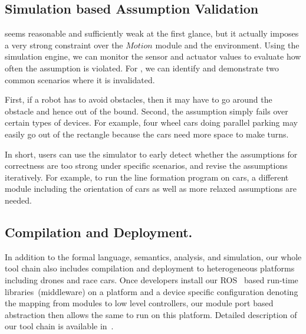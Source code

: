 \subsection{Simulation based Assumption Validation}

 seems reasonable and sufficiently weak at the first glance,
but it actually imposes a very strong constraint over the $Motion$ module and the environment.
Using the simulation engine, we can monitor the sensor and actuator values to evaluate how often the assumption is violated.
For , we can identify and demonstrate two common scenarios
where it is invalidated.

First, if a robot has to avoid obstacles,
then it may have to go around the obstacle and hence out of the bound.
Second, the assumption simply fails over certain types of devices.
For example, four wheel cars doing parallel parking may easily go out of the rectangle
because the cars need more space to make turns.

In short, users can use the simulator to early detect whether
the assumptions for correctness are too strong under specific scenarios,
and revise the assumptions iteratively.
For example, to run the line formation program on cars,
a different module including the orientation of cars as well as more relaxed assumptions are needed.

\subsection{Compilation and Deployment.}
In addition to the formal language, semantics, analysis, and simulation,
our whole tool chain also includes compilation and deployment to heterogeneous platforms including drones and race cars.
Once developers install our ROS~\cite{ros} based run-time libraries~(middleware) on a platform
and a device specific configuration denoting the mapping from \lgname modules to low level controllers,
our module port based abstraction then allows the same \lgname to run on this platform.
Detailed description of our tool chain is available in~\cite{ghosh2019cyphyhouse}.
